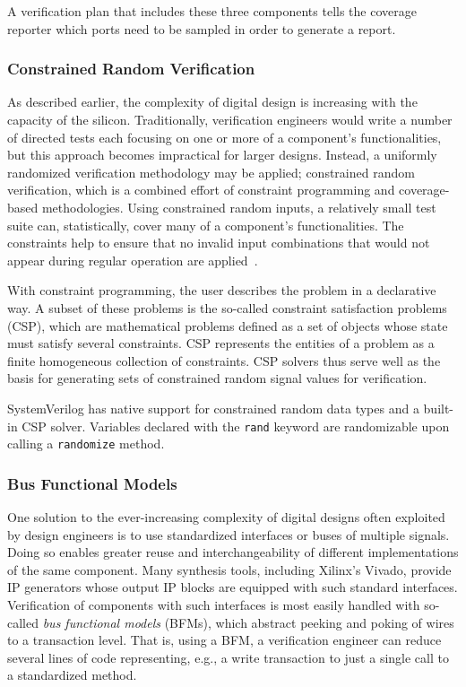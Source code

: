 \documentclass[conference]{IEEEtran}
\begin{document}
A verification plan that includes these three components tells the coverage reporter which ports need to be sampled in order to generate a report.

\subsubsection{Constrained Random Verification}
As described earlier, the complexity of digital design is increasing with the capacity of the silicon. Traditionally, verification engineers would write a number of directed tests each focusing on one or more of a component's functionalities, but this approach becomes impractical for larger designs. Instead, a uniformly randomized verification methodology may be applied; constrained random verification, which is a combined effort of constraint programming and coverage-based methodologies.
Using constrained random inputs, a relatively small test suite can, statistically, cover many of a component's functionalities. 
The constraints help to ensure that no invalid input combinations that would not appear during regular operation are applied~\cite{MehtaCRV2018}.

With constraint programming, the user describes the problem in a declarative way. A subset of these problems is the so-called constraint satisfaction problems (CSP), which are mathematical problems defined as a set of objects whose state must satisfy several constraints. CSP represents the entities of a problem as a finite homogeneous collection of constraints. CSP solvers thus serve well as the basis for generating sets of constrained random signal values for verification.

SystemVerilog has native support for constrained random data types and a built-in CSP solver. Variables declared with the \texttt{rand} keyword are randomizable upon calling a \texttt{randomize} method.

\subsubsection{Bus Functional Models}
One solution to the ever-increasing complexity of digital designs often exploited by design engineers is to use standardized interfaces or buses of multiple signals. Doing so enables greater reuse and interchangeability of different implementations of the same component. Many synthesis tools, including Xilinx's Vivado, provide IP generators whose output IP blocks are equipped with such standard interfaces. Verification of components with such interfaces is most easily handled with so-called \textit{bus functional models} (BFMs), which abstract peeking and poking of wires to a transaction level. That is, using a BFM, a verification engineer can reduce several lines of code representing, e.g., a write transaction to just a single call to a standardized method.
\end{document}
